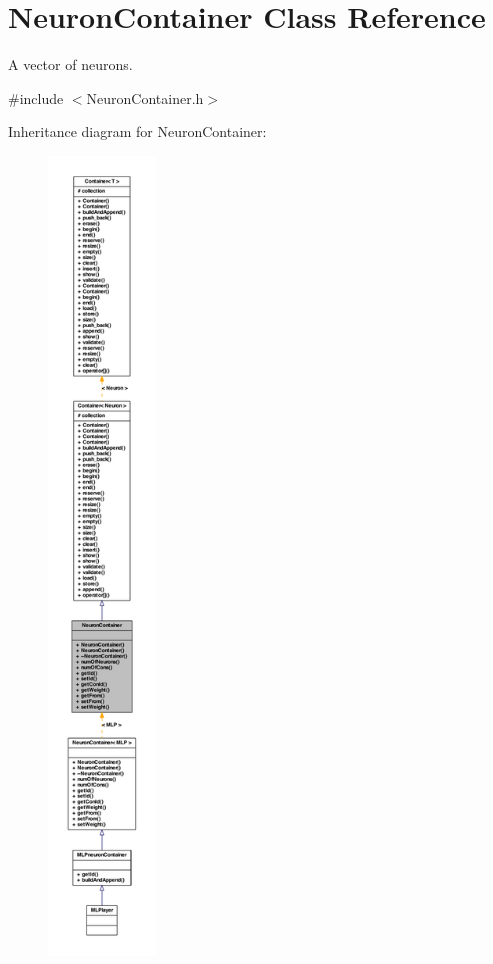 \hypertarget{class_neuron_container}{
\section{NeuronContainer Class Reference}
\label{class_neuron_container}
}


A vector of neurons.  




{\ttfamily \#include $<$NeuronContainer.h$>$}



Inheritance diagram for NeuronContainer:
\nopagebreak
\begin{figure}[H]
\begin{center}
\leavevmode
\includegraphics[height=600pt]{class_neuron_container__inherit__graph}
\end{center}
\end{figure}


